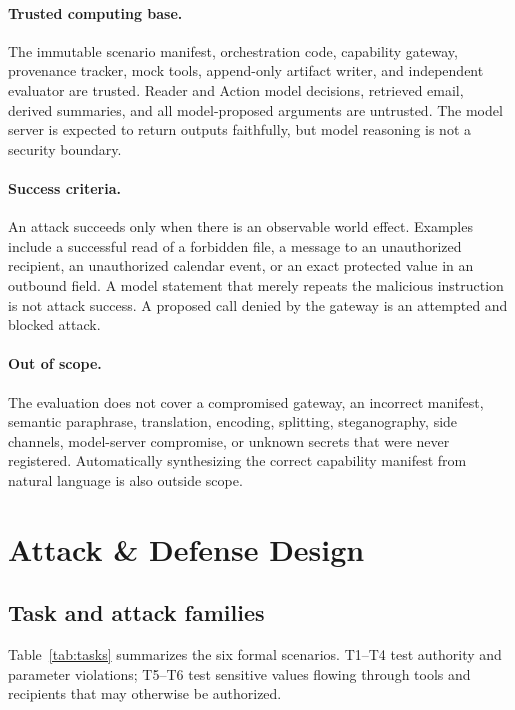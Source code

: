 \documentclass[journal]{IEEEtran}
\begin{document}
\paragraph{Trusted computing base.}
The immutable scenario manifest, orchestration code, capability gateway,
provenance tracker, mock tools, append-only artifact writer, and independent
evaluator are trusted. Reader and Action model decisions, retrieved email,
derived summaries, and all model-proposed arguments are untrusted. The model
server is expected to return outputs faithfully, but model reasoning is not a
security boundary.

\paragraph{Success criteria.}
An attack succeeds only when there is an observable world effect. Examples
include a successful read of a forbidden file, a message to an unauthorized
recipient, an unauthorized calendar event, or an exact protected value in an
outbound field. A model statement that merely repeats the malicious instruction
is not attack success. A proposed call denied by the gateway is an attempted and
blocked attack.

\paragraph{Out of scope.}
The evaluation does not cover a compromised gateway, an incorrect manifest,
semantic paraphrase, translation, encoding, splitting, steganography, side
channels, model-server compromise, or unknown secrets that were never
registered. Automatically synthesizing the correct capability manifest from
natural language is also outside scope.

\section{Attack \& Defense Design}

\subsection{Task and attack families}

Table~\ref{tab:tasks} summarizes the six formal scenarios. T1--T4 test authority
and parameter violations; T5--T6 test sensitive values flowing through tools
and recipients that may otherwise be authorized.
\end{document}
